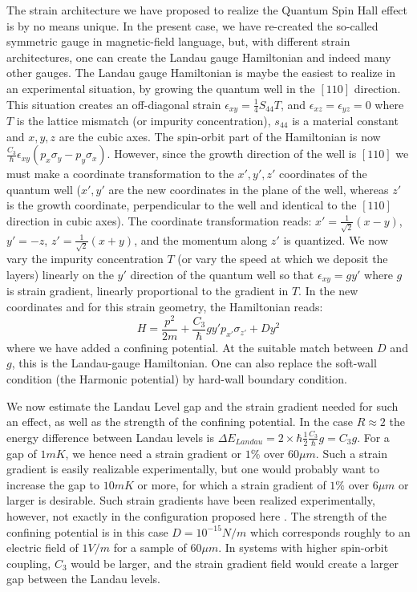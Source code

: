 \documentclass[prl,aps,amssymb,shownopacs,twocolumn]{revtex4}
\begin{document}
	The strain architecture we have proposed to realize the Quantum Spin
	Hall effect is by no means unique. In the present case, we have
	re-created the so-called symmetric gauge in magnetic-field language,
	but, with different strain architectures, one can create the Landau
	gauge Hamiltonian and indeed many other gauges. The Landau gauge
	Hamiltonian is maybe the easiest to realize in an experimental
	situation, by growing the quantum well in the $[110]$ direction.
	This situation creates an off-diagonal strain $\epsilon_{xy}  =
	\frac{1}{4} S_{44} T$, and $\epsilon_{xz} = \epsilon_{yz} =0$ where
	$T$ is the lattice mismatch (or impurity concentration), $s_{44}$ is
	a material constant and $x,y,z$ are the cubic axes. The spin-orbit
	part of the Hamiltonian is now $\frac{C_3}{\hbar} \epsilon_{xy} (p_x
	\sigma_y - p_y \sigma_x)$. However, since the growth direction of
	the well is $[110]$ we must make a coordinate transformation to the
	$x',y',z'$ coordinates of the quantum well ($x', y'$ are the new
	coordinates in the plane of the well, whereas $z'$ is the growth
	coordinate, perpendicular to the well and identical to the $[110]$
	direction in cubic axes). The coordinate transformation reads: $x'
	=\frac{1}{\sqrt{2} }(x-y)$, $y' = -z$, $z' = \frac{1}{\sqrt{2}}
	(x+y)$, and the momentum along $z'$ is quantized. We now vary the
	impurity concentration $T$ (or vary the speed at which we deposit
	the layers) linearly on the $y'$ direction of the quantum well so
	that $\epsilon_{xy}= g y'$ where $g$ is strain gradient, linearly
	proportional to the gradient in $T$. In the new coordinates and for
	this strain geometry, the Hamiltonian reads:
	\begin{equation}
		H = \frac{p^2}{2m} + \frac{C_3}{\hbar} g y' p_{x'} \sigma_{z'} + D
		y^2
	\end{equation}
	\noindent where we have added a confining potential. At the
	suitable match between $D$ and $g$, this is the Landau-gauge
	Hamiltonian. One can also replace the soft-wall condition (the
	Harmonic potential) by hard-wall boundary condition.
	
	We now estimate the Landau Level gap and the strain gradient
	needed for such an effect, as well as the strength of the
	confining potential. In the case $R \approx 2$ the energy
	difference between Landau levels is $\Delta E_{Landau} = 2 \times
	\hbar \frac{1}{2} \frac{C_3}{\hbar} g = C_3 g$. For a gap of
	$1mK$, we hence need a strain gradient or $1 \%$ over $60 \mu m$.
	Such a strain gradient is easily realizable experimentally, but
	one would probably want to increase the gap to $10mK$ or more, for
	which a strain gradient of $1 \%$ over $6 \mu m$ or larger is
	desirable. Such strain gradients have been realized
	experimentally, however, not exactly in the configuration proposed
	here \cite{shen1996,shen1997}. The strength of the confining
	potential is in this case $D = 10^{-15} N/m$ which corresponds
	roughly to an electric field of $1 V/m$ for a sample of $60 \mu
	m$. In systems with higher spin-orbit coupling, $C_3$ would be
	larger, and the strain gradient field would create a larger gap
	between the Landau levels.
	
\end{document}
